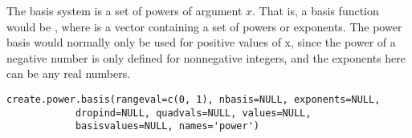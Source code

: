 \documentclass{article}
\begin{document}
\begin{Description}\relax
The basis system is a set of powers of argument $x$.  That is, a basis
function would be , where  is a vector
containing a set of powers or exponents.  The power basis would
normally only be used for positive values of x, since the power of a
negative number is only defined for nonnegative integers, and the
exponents here can be any real numbers.
\end{Description}
\begin{Usage}
\begin{verbatim}
create.power.basis(rangeval=c(0, 1), nbasis=NULL, exponents=NULL,
            dropind=NULL, quadvals=NULL, values=NULL,
            basisvalues=NULL, names='power')
\end{verbatim}
\end{Usage}
\end{document}
